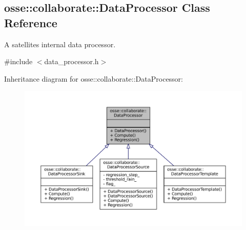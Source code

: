 \hypertarget{classosse_1_1collaborate_1_1_data_processor}{}\subsection{osse\+:\+:collaborate\+:\+:Data\+Processor Class Reference}
\label{classosse_1_1collaborate_1_1_data_processor}


A satellite\textquotesingle{}s internal data processor.  




{\ttfamily \#include $<$data\+\_\+processor.\+h$>$}



Inheritance diagram for osse\+:\+:collaborate\+:\+:Data\+Processor\+:
\nopagebreak
\begin{figure}[H]
\begin{center}
\leavevmode
\includegraphics[width=350pt]{classosse_1_1collaborate_1_1_data_processor__inherit__graph}
\end{center}
\end{figure}
